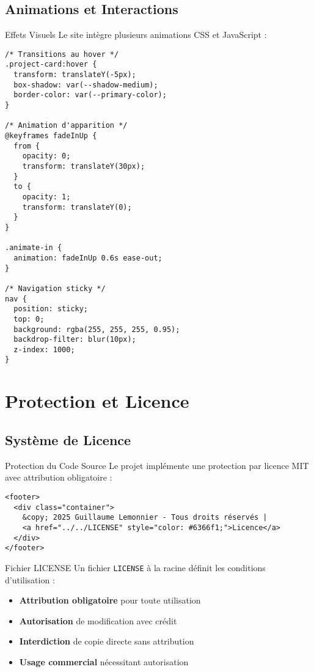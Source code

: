 \documentclass[12pt,a4paper]{article}
\begin{document}
\subsection{Animations et Interactions}

\begin{yellowbox}{Effets Visuels}
Le site intègre plusieurs animations CSS et JavaScript :
\end{yellowbox}

\begin{lstlisting}[style=cssstyle, caption=Animations CSS]
/* Transitions au hover */
.project-card:hover {
  transform: translateY(-5px);
  box-shadow: var(--shadow-medium);
  border-color: var(--primary-color);
}

/* Animation d'apparition */
@keyframes fadeInUp {
  from {
    opacity: 0;
    transform: translateY(30px);
  }
  to {
    opacity: 1;
    transform: translateY(0);
  }
}

.animate-in {
  animation: fadeInUp 0.6s ease-out;
}

/* Navigation sticky */
nav {
  position: sticky;
  top: 0;
  background: rgba(255, 255, 255, 0.95);
  backdrop-filter: blur(10px);
  z-index: 1000;
}
\end{lstlisting}

\section{Protection et Licence}

\subsection{Système de Licence}

\begin{redbox}{Protection du Code Source}
Le projet implémente une protection par licence MIT avec attribution obligatoire :
\end{redbox}

\begin{lstlisting}[style=htmlstyle, caption=Footer avec licence sur chaque page]
<footer>
  <div class="container">
    &copy; 2025 Guillaume Lemonnier - Tous droits réservés | 
    <a href="../../LICENSE" style="color: #6366f1;">Licence</a>
  </div>
</footer>
\end{lstlisting}

\begin{greenbox}{Fichier LICENSE}
Un fichier \texttt{LICENSE} à la racine définit les conditions d'utilisation :
\begin{itemize}[label=\textcolor{greencolor}{$\bullet$}]
    \item \textbf{Attribution obligatoire} pour toute utilisation
    \item \textbf{Autorisation} de modification avec crédit
    \item \textbf{Interdiction} de copie directe sans attribution
    \item \textbf{Usage commercial} nécessitant autorisation
\end{itemize}
\end{greenbox}
\end{document}
